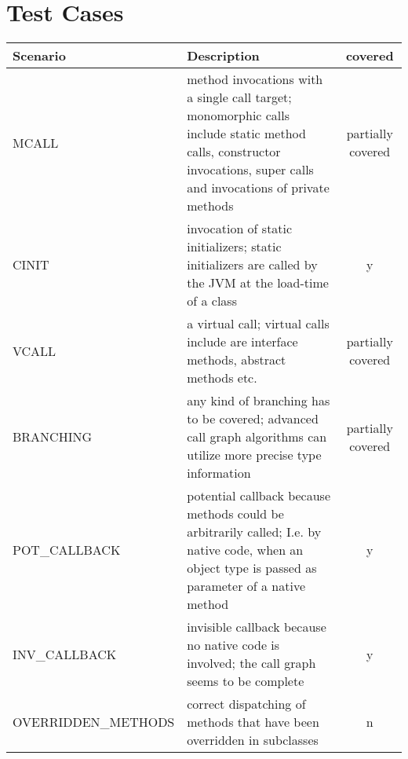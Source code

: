 \section{Test Cases}
\label{section:cornercases}

\begin{table}[htpb]
	\small
	\setlength{\tabcolsep}{5pt}
	\noindent
	\begin{tabularx}{\textwidth}{ l X c}
		\toprule
		\textbf{Scenario}                           & \textbf{Description}                                                                                                                                                 & \textbf{covered}  \\ \midrule
		\rowcolor{light-gray}
		MCALL               & method invocations with a single call target; monomorphic calls include static method calls, constructor invocations, super calls and invocations of private methods & partially covered \\
		CINIT                                       & invocation of static initializers; static initializers are called by the JVM at the load-time of a class                                                             & y                 \\
		\rowcolor{light-gray}
		VCALL               & a virtual call; virtual calls include are interface methods, abstract methods etc.                                                                                   & partially covered \\
		BRANCHING                                   & any kind of branching has to be covered; advanced call graph algorithms can utilize more precise type information                                                    & partially covered \\
		\rowcolor{light-gray}
		POT\_CALLBACK       & potential callback because methods could be arbitrarily called; I.e. by native code, when an object type is passed as parameter of a native method                   & y                 \\
		INV\_CALLBACK                               & invisible callback because no native code is involved; the call graph seems to be complete                                                                           & y                 \\
		\rowcolor{light-gray}
		OVERRIDDEN\_METHODS & correct dispatching of methods that have been overridden in subclasses                                                                                               & n                 \\

\end{tabularx}
\end{table}
